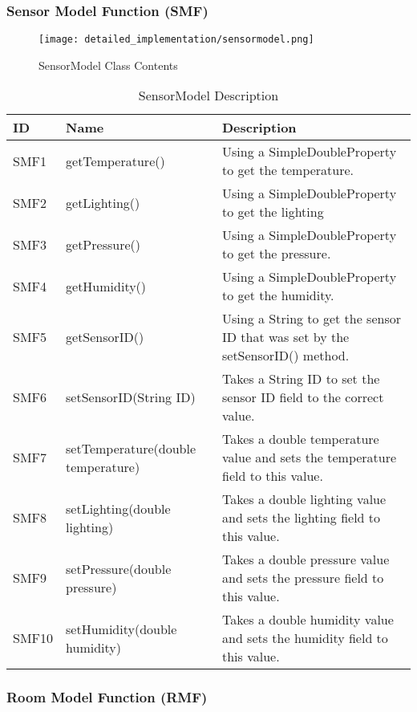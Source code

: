 \documentclass[../document]{subfiles}
\begin{document}
\subsubsection{Sensor Model Function (SMF)}

\begin{figure}[H]
\centering
\texttt{[image: detailed\_implementation/sensormodel.png]}
\caption{SensorModel Class Contents}
\end{figure}

\begin{table}[H]
\caption{SensorModel Description}
\centering
\begin{tabularx}{\textwidth}{|L{1.2cm}|L{3.5cm}|X|}
	\hline
	ID
	&Name
	&Description
	\\ \hline SMF1 
	&getTemperature()
	&Using a SimpleDoubleProperty to get the temperature.
	\\ \hline SMF2
	&getLighting()
	&Using a SimpleDoubleProperty to get the lighting
	\\ \hline SMF3
	&getPressure()
	&Using a SimpleDoubleProperty to get the pressure.
	\\ \hline SMF4
	&getHumidity()
	&Using a SimpleDoubleProperty to get the humidity.
	\\ \hline SMF5
	&getSensorID()
	&Using a String to get the sensor ID that was set by the setSensorID() method.
	\\ \hline SMF6
	&setSensorID(String ID)
	&Takes a String ID to set the sensor ID field to the correct value.
	\\ \hline SMF7
	&setTemperature(double temperature)
	&Takes a double temperature value and sets the temperature field to this value.
	\\ \hline SMF8
	&setLighting(double lighting)
	&Takes a double lighting value and sets the lighting field to this value.
	\\ \hline SMF9
	&setPressure(double pressure)
	&Takes a double pressure value and sets the pressure field to this value.
	\\ \hline SMF10
	&setHumidity(double humidity)
	&Takes a double humidity value and sets the humidity field to this value.
	\\ \hline 
\end{tabularx}
\end{table}

\subsubsection{Room Model Function (RMF)}
\end{document}
